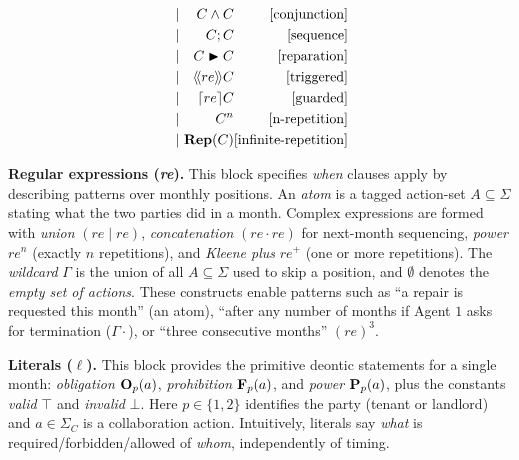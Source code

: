 \documentclass{article}
\begin{document}
\begin{figure}[h]
{\begin{minipage}{0.96\textwidth}
\[\begin{alignedat}{3}
    &\mid&\ C \wedge C                              && \hfill[\text{conjunction}] \\
    &\mid&\ C ; C                                   && \hfill[\text{sequence}] \\
    &\mid&\ C \repair C                             && \hfill[\text{reparation}] \\
    &\mid&\ \trig[re]{C}                   && \hfill[\text{triggered}] \\
    &\mid&\ \guard[re]{C}                           && \hfill[\text{guarded}] \\
    &\mid&\ C^n                                     && \hfill[\text{n-repetition}]\\
    &\mid&\ \repit{C}                               && \hfill[\text{infinite-repetition}]
  \end{alignedat}
  \]
  \end{minipage}}
  \end{figure}
  
  
   
  \medskip
  \noindent\textbf{Regular expressions (\emph{re}).}
  This block specifies \emph{when} clauses apply by describing patterns over monthly positions.
  An \emph{atom} is a tagged action-set \(A \subseteq \Sigma\) stating what the two parties did in a month.
  Complex expressions are formed with \emph{union} \((re \mid re)\), \emph{concatenation} \((re \cdot re)\) for next-month sequencing,
  \emph{power} \(re^n\) (exactly \(n\) repetitions), and \emph{Kleene plus} \(re^+\) (one or more repetitions).
  The \emph{wildcard} \(\Gamma\) is the union of all $A \subseteq \Sigma$ used to skip a position, and \(\emptyset\) denotes the \emph{empty set of actions}.
  These constructs enable patterns such as “a repair is requested this month” (an atom), “after any number of months if Agent $1$ asks for termination (\(\Gamma \cdot\)), or “three consecutive months” \((re)^3\).
  
  \medskip
  \noindent\textbf{Literals (\emph{\(\ell\)}).}
  This block provides the primitive deontic statements for a single month:
  \emph{obligation} \(\obl[p]{a}\), \emph{prohibition} \(\frb[p]{a}\), and \emph{power} \(\perm[p]{a}\),
  plus the constants \emph{valid} \(\top\) and \emph{invalid} \(\bot\).
  Here \(p \in \{1,2\}\) identifies the party (tenant or landlord) and \(a \in \Sigma_C\) is a collaboration action.
  Intuitively, literals say \emph{what} is required/forbidden/allowed of \emph{whom}, independently of timing.
  
\end{document}
